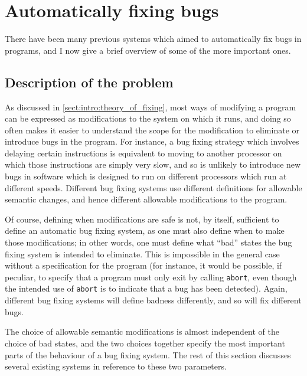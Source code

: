 \section{Automatically fixing bugs}

There have been many previous systems which aimed to automatically fix
bugs in programs, and I now give a brief overview of some of the more
important ones.

\subsection{Description of the problem}
\label{sect:rw:theory_of_fixing}


As discussed in \autoref{sect:intro:theory_of_fixing}, most ways of
modifying a program can be expressed as modifications to the system on
which it runs, and doing so often makes it easier to understand the
scope for the modification to eliminate or introduce bugs in the
program.  For instance, a bug fixing strategy which involves delaying
certain instructions is equivalent to moving to another processor on
which those instructions are simply very slow, and so is unlikely to
introduce new bugs in software which is designed to run on different
processors which run at different speeds.  Different bug fixing
systems use different definitions for allowable semantic changes, and
hence different allowable modifications to the program.

Of course, defining when modifications are safe is not, by itself,
sufficient to define an automatic bug fixing system, as one must also
define when to make those modifications; in other words, one must
define what ``bad'' states the bug fixing system is intended to
eliminate.  This is impossible in the general case without a
specification for the program (for instance, it would be possible, if
peculiar, to specify that a program must only exit by calling
\texttt{abort}, even though the intended use of \texttt{abort} is to
indicate that a bug has been detected).  Again, different bug fixing
systems will define badness differently, and so will fix different
bugs.

The choice of allowable semantic modifications is almost independent
of the choice of bad states, and the two choices together specify the
most important parts of the behaviour of a bug fixing system.  The
rest of this section discusses several existing systems in reference
to these two parameters.

